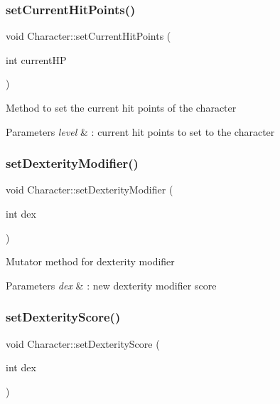 \subsubsection{\texorpdfstring{set\+Current\+Hit\+Points()}{setCurrentHitPoints()}}
{\footnotesize\ttfamily void Character\+::set\+Current\+Hit\+Points (\begin{DoxyParamCaption}\item[{int}]{current\+HP }\end{DoxyParamCaption})}

Method to set the current hit points of the character 
\begin{DoxyParams}{Parameters}
{\em level} & \+: current hit points to set to the character \\
\hline
\end{DoxyParams}
\hypertarget{class_character_a667cb495021fa02cf0f0abebade3e3aa}{}\label{class_character_a667cb495021fa02cf0f0abebade3e3aa} 
\subsubsection{\texorpdfstring{set\+Dexterity\+Modifier()}{setDexterityModifier()}}
{\footnotesize\ttfamily void Character\+::set\+Dexterity\+Modifier (\begin{DoxyParamCaption}\item[{int}]{dex }\end{DoxyParamCaption})}

Mutator method for dexterity modifier 
\begin{DoxyParams}{Parameters}
{\em dex} & \+: new dexterity modifier score \\
\hline
\end{DoxyParams}
\hypertarget{class_character_a6714e60888cf852dd48d45919c0e29c6}{}\label{class_character_a6714e60888cf852dd48d45919c0e29c6} 
\subsubsection{\texorpdfstring{set\+Dexterity\+Score()}{setDexterityScore()}}
{\footnotesize\ttfamily void Character\+::set\+Dexterity\+Score (\begin{DoxyParamCaption}\item[{int}]{dex }\end{DoxyParamCaption})}

